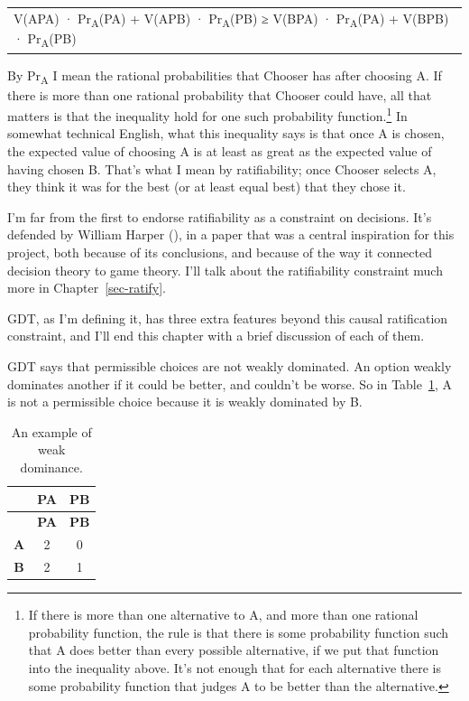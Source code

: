 \documentclass[
  12pt,
  letterpaper,
  DIV=11,
  numbers=noendperiod]{scrreprt}
\begin{document}
\begin{longtable}[]{@{}
  >{\centering\arraybackslash}p{}@{}}
\toprule\noalign{}
\endhead
\bottomrule\noalign{}
\endlastfoot
V(APA) · Pr\textsubscript{A}(PA) + V(APB) · Pr\textsubscript{A}(PB) ≥
V(BPA) · Pr\textsubscript{A}(PA) + V(BPB) · Pr\textsubscript{A}(PB) \\
\end{longtable}

By Pr\textsubscript{A} I mean the rational probabilities that Chooser
has after choosing A. If there is more than one rational probability
that Chooser could have, all that matters is that the inequality hold
for one such probability function.\footnote{If there is more than one
  alternative to A, and more than one rational probability function, the
  rule is that there is some probability function such that A does
  better than every possible alternative, if we put that function into
  the inequality above. It's not enough that for each alternative there
  is some probability function that judges A to be better than the
  alternative.} In somewhat technical English, what this inequality says
is that once A is chosen, the expected value of choosing A is at least
as great as the expected value of having chosen B. That's what I mean by
ratifiability; once Chooser selects A, they think it was for the best
(or at least equal best) that they chose it.

I'm far from the first to endorse ratifiability as a constraint on
decisions. It's defended by William Harper
(), in a paper that was a central
inspiration for this project, both because of its conclusions, and
because of the way it connected decision theory to game theory. I'll
talk about the ratifiability constraint much more in
Chapter~\ref{sec-ratify}.

GDT, as I'm defining it, has three extra features beyond this causal
ratification constraint, and I'll end this chapter with a brief
discussion of each of them.

GDT says that permissible choices are not weakly dominated. An option
weakly dominates another if it could be better, and couldn't be worse.
So in Table~\ref{tbl-weak-dominance-example}, A is not a permissible
choice because it is weakly dominated by B.

\begin{longtable}[]{@{}ccc@{}}
\caption{An example of weak
dominance.}\label{tbl-weak-dominance-example}\tabularnewline
\toprule\noalign{}
& \textbf{PA} & \textbf{PB} \\
\midrule\noalign{}
\endfirsthead
\toprule\noalign{}
& \textbf{PA} & \textbf{PB} \\
\midrule\noalign{}
\endhead
\bottomrule\noalign{}
\endlastfoot
\textbf{A} & 2 & 0 \\
\textbf{B} & 2 & 1 \\
\end{longtable}
\end{document}
